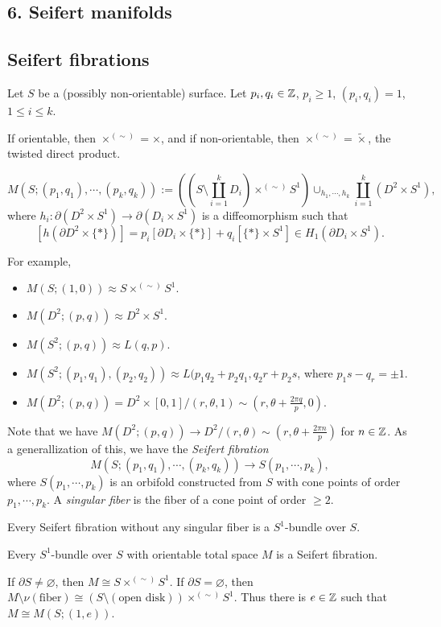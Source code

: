 \documentclass{../../small}
\begin{document}
\setcounter{section}{6}
\subsection*{6. Seifert manifolds}
\subsection{Seifert fibrations}
\setcounter{thm}{0}

Let $S$ be a (possibly non-orientable) surface.
Let $p_i,q_i\in\mathbb{Z}$, $p_i\ge1$, $(p_i,q_i)=1$, $1\le i\le k$.

If orientable, then $\times^{(\sim)}=\times$, and if non-orientable, then $\times^{(\sim)}=\tilde\times$, the twisted direct product.

\[M(S;(p_1,q_1),\cdots,(p_k,q_k)):=\left((S\setminus\coprod_{i=1}^kD_i)\times^{(\sim)}S^1\right)\cup_{h_1,\cdots,h_k}\coprod_{i=1}^k(D^2\times S^1),\]
where $h_i:\partial(D^2\times S^1)\to\partial(D_i\times S^1)$ is a diffeomorphism such that
\[[h(\partial D^2\times\{*\})]=p_i[\partial D_i\times\{*\}]+q_i[\{*\}\times S^1]\in H_1(\partial D_i\times S^1).\]

For example,
\begin{itemize}
\item $M(S;(1,0))\approx S\times^{(\sim)}S^1$.
\item $M(D^2;(p,q))\approx D^2\times S^1$.
\item $M(S^2;(p,q))\approx L(q,p)$.
\item $M(S^2;(p_1,q_1),(p_2,q_2))\approx L(p_1q_2+p_2q_1,q_2r+p_2s$, where $p_1s-q_r=\pm1$.
\item $M(D^2;(p,q))=D^2\times[0,1]/(r,\theta,1)\sim(r,\theta+\frac{2\pi q}p,0)$.
\end{itemize}
Note that we have $M(D^2;(p,q))\to D^2/(r,\theta)\sim(r,\theta+\frac{2\pi n}p)$ for $n\in\mathbb{Z}$.
As a generallization of this, we have the \emph{Seifert fibration}
\[M(S;(p_1,q_1),\cdots,(p_k,q_k))\to S(p_1,\cdots,p_k),\]
where $S(p_1,\cdots,p_k)$ is an orbifold constructed from $S$ with cone points of order $p_1,\cdots,p_k$.
A \emph{singular fiber} is the fiber of a cone point of order $\ge2$.
\begin{rmk*}
Every Seifert fibration without any singular fiber is a $S^1$-bundle over $S$.
\end{rmk*}

\begin{prop}
Every $S^1$-bundle over $S$ with orientable total space $M$ is a Seifert fibration.
\end{prop}
\begin{pf}
If $\partial S\ne\varnothing$, then $M\cong S\times^{(\sim)}S^1$.
If $\partial S=\varnothing$, then $M\setminus\nu(\text{fiber})\cong(S\setminus(\text{open disk}))\times^{(\sim)}S^1$.
Thus there is $e\in\mathbb{Z}$ such that $M\cong M(S;(1,e))$.
\end{pf}
\end{document}
